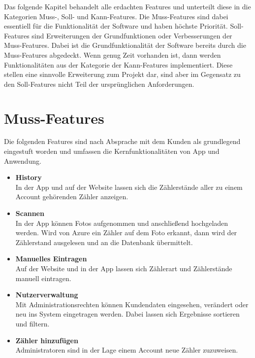 
Das folgende Kapitel behandelt alle erdachten Features und unterteilt diese in die Kategorien Muss-, Soll- und Kann-Features. 
Die Muss-Features sind dabei essentiell für die Funktionalität der Software und haben höchste Priorität.
Soll-Features sind Erweiterungen der Grundfunktionen oder Verbesserungen der Muss-Features. Dabei ist die Grundfunktionalität der Software bereits durch die Muss-Features abgedeckt.
Wenn genug Zeit vorhanden ist, dann werden Funktionalitäten aus der Kategorie der Kann-Features implementiert. 
Diese stellen eine sinnvolle Erweiterung zum Projekt dar, sind aber im Gegensatz zu den Soll-Features nicht Teil der ursprünglichen Anforderungen.
\section{Muss-Features}
Die folgenden Features sind nach Absprache mit dem Kunden als grundlegend eingestuft worden und umfassen die Kernfunktionalitäten von App und Anwendung.
\begin{itemize}
\item \textbf{History} \hfill \\
	In der App und auf der Website lassen sich die Zählerstände aller zu einem Account gehörenden Zähler anzeigen.
\item \textbf{Scannen} \hfill \\
	In der App können Fotos aufgenommen und anschließend hochgeladen werden. 
	Wird von Azure ein Zähler auf dem Foto erkannt, dann wird der Zählerstand ausgelesen und an die Datenbank übermittelt.
\item \textbf{Manuelles Eintragen} \hfill \\
	Auf der Website und in der App lassen sich Zählerart und Zählerstände manuell eintragen.
\item \textbf{Nutzerverwaltung} \hfill \\
	Mit Administrationsrechten können Kundendaten eingesehen, verändert oder neu ins System eingetragen werden.
	Dabei lassen sich Ergebnisse sortieren und filtern.
\item \textbf{Zähler hinzufügen} \hfill \\
	Administratoren sind in der Lage einem Account neue Zähler zuzuweisen.	
\end{itemize}
\newpage
